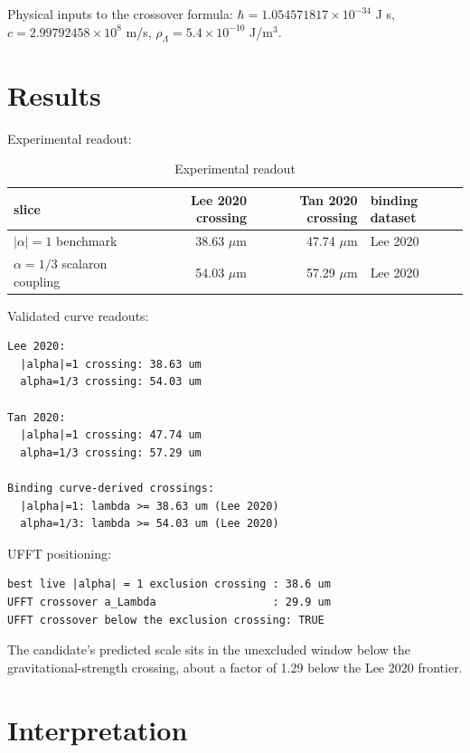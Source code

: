 \documentclass{article}
\begin{document}
Physical inputs to the crossover formula:
$\hbar=1.054571817\times10^{-34}$ J s,
$c=2.99792458\times10^8$ m/s,
$\rho_\Lambda=5.4\times10^{-10}$ J/m$^3$.

\section{Results}

Experimental readout:

\begin{table}[h]
\centering
\begin{tabularx}{\textwidth}{|X|r|r|X|}
\hline
\textbf{slice} & \textbf{Lee 2020 crossing} & \textbf{Tan 2020 crossing} & \textbf{binding dataset} \\
\hline
$|\alpha|=1$ benchmark & 38.63 $\mu$m & 47.74 $\mu$m & Lee 2020 \\
\hline
$\alpha=1/3$ scalaron coupling & 54.03 $\mu$m & 57.29 $\mu$m & Lee 2020 \\
\hline
\end{tabularx}
\caption{Experimental readout}
\end{table}

Validated curve readouts:

\begin{lstlisting}
Lee 2020:
  |alpha|=1 crossing: 38.63 um
  alpha=1/3 crossing: 54.03 um

Tan 2020:
  |alpha|=1 crossing: 47.74 um
  alpha=1/3 crossing: 57.29 um

Binding curve-derived crossings:
  |alpha|=1: lambda >= 38.63 um (Lee 2020)
  alpha=1/3: lambda >= 54.03 um (Lee 2020)
\end{lstlisting}

UFFT positioning:

\begin{lstlisting}
best live |alpha| = 1 exclusion crossing : 38.6 um
UFFT crossover a_Lambda                  : 29.9 um
UFFT crossover below the exclusion crossing: TRUE
\end{lstlisting}

The candidate's predicted scale sits in the unexcluded window below the
gravitational-strength crossing, about a factor of 1.29 below the Lee 2020
frontier.

\section{Interpretation}
\end{document}
